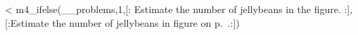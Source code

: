 <%
m4_ifelse(__problems,1,[:%
Estimate the number of jellybeans in the figure.
:],[:Estimate the number of jellybeans in figure  on p.~\pageref{fig:jelly-beans}.:])
